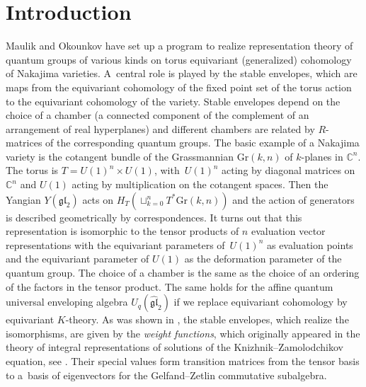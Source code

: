 \documentclass[pdftex]{sigma}
\numberwithin{equation}{section}
\begin{document}

\renewcommand{\thefootnote}{\arabic{footnote}}
\setcounter{footnote}{0}

\section{Introduction}\label{s-1}
Maulik and Okounkov \cite{MO} have set up a program to realize representation theory of quantum groups of various kinds on torus equivariant (generalized) cohomology of Nakajima varieties. A~central role is played by the stable envelopes, which are maps from the equivariant cohomology of the fixed point set of the torus action to the equivariant cohomology of the variety. Stable envelopes depend on the choice of a chamber (a connected component of the complement of an arrangement of real hyperplanes) and different chambers are related by $R$-matrices of the corresponding quantum groups. The basic example of a Nakajima variety is the cotangent bundle of the Grassmannian $\mathrm{Gr}(k,n)$ of $k$-planes in $\mathbb C^n$. The torus is $T=U(1)^{n}\times U(1)$, with~$U(1)^n$ acting by diagonal matrices on $\mathbb C^n$ and $U(1)$ acting by multiplication on the cotangent spaces. Then the Yangian $Y(\mathfrak{gl}_2)$ acts on $H_T(\sqcup_{k=0}^nT^*\mathrm{Gr}(k,n))$ and the action of generators is described geometrically by correspondences. It turns out that this representation is isomorphic to the tensor products of $n$ evaluation vector representations with the equivariant parameters of~$U(1)^n$ as evaluation points and the equivariant parameter of $U(1)$ as the deformation parameter of the quantum group. The choice of a chamber is the same as the choice of an ordering of the factors in the tensor product. The same holds for the affine quantum universal enveloping algebra $U_q(\widehat {\mathfrak{gl}}_2)$ if we replace equivariant cohomology by equivariant $K$-theory. As was shown in \cite{GRTV, RTV}, the stable envelopes, which realize the isomorphisms, are given by the {\em weight functions}, which originally appeared in the theory of integral representations of solutions of the Knizhnik--Zamolodchikov equation, see \cite{TV1,TV2}. Their special values form transition matrices from the tensor basis to a~basis of eigenvectors for the Gelfand--Zetlin commutative subalgebra.
\end{document}
